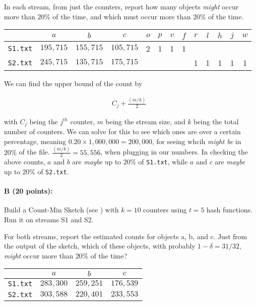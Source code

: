 \documentclass[11pt]{article}
\begin{document}
In each stream, from just the counters, report how many objects \emph{might} occur more than $20\%$ of the time, and which must occur more than $20\%$ of the time.  

\begin{table}[H]
\centering
\begin{tabular}{c | c c c c c c c c c c c c}
\hline\hline
 & $a$ & $b$ & $c$ & $o$ & $p$ & $v$ & $f$ & $r$ & $l$ & $h$ & $j$ & $w$\\
\hline
{\tt S1.txt} & $195,715$ & $155,715$ & $105,715$ & 2 & 1 & 1 & 1\\
{\tt S2.txt} & $245,715$ & $135,715$ & $175,715$ & & & & & 1 & 1 & 1 & 1 & 1\\
\hline
\end{tabular}
\end{table}

We can find the upper bound of the count by

\begin{align*}
C_{j} + \frac{(m/k)}{2}
\end{align*}

with $C_{j}$ being the $j^{th}$ counter, $m$ being the stream size, and $k$ being the total number of counters. We can solve for this to see which ones are over a certain percentage, meaning $0.20 \times 1,000,000 = 200,000$, for seeing whcih {\em might be} in $20\%$ of the file. $\frac{(m/k)}{2} = 55,556$, when plugging in our numbers. In checking the above counts, $a$ and $b$ are {\em maybe} up to 20\% of {\tt S1.txt}, while $a$ and $c$ are {\em maybe} up to 20\% of {\tt S2.txt}.

\paragraph{B (20 points):}  
Build a Count-Min Sketch  (see \textbf{}) with $k=10$ counters using $t=5$ hash functions.  Run it on streams S1 and S2.  

For both streams, report the estimated counts for objects \textsf{a}, \textsf{b}, and \textsf{c}.  
Just from the output of the sketch, which of these objects, with probably $1-\delta = 31/32$, \emph{might} occur more than $20\%$ of the time?  

\begin{table}[H]
\centering
\begin{tabular}{c | c c c}
\hline\hline
 & $a$ & $b$ & $c$\\
\hline
{\tt S1.txt} & $283,300$ & $259,251$ & $176,539$\\
{\tt S2.txt} & $303,588$ & $220,401$ & $233,553$\\
\hline
\end{tabular}
\end{table}
\end{document}
